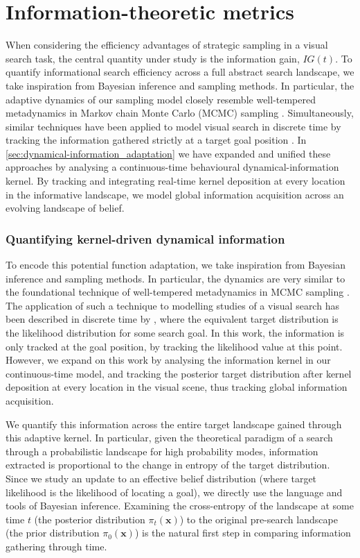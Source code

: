 \section{Information-theoretic metrics}\label{sec:information-theoretic_metrics}
When considering the efficiency advantages of strategic sampling in a visual search task, the central quantity under study is the information gain, $IG(t)$. To quantify informational search efficiency across a full abstract search landscape, we take inspiration from Bayesian inference and sampling methods. In particular, the adaptive dynamics of our sampling model closely resemble well-tempered metadynamics in Markov chain Monte Carlo (MCMC) sampling \cite{tiwary_time-independent_2015}. Simultaneously, similar techniques have been applied to model visual search in discrete time by tracking the information gathered strictly at a target goal position \cite{bujia_modeling_2022}. In \cref{sec:dynamical-information_adaptation} we have expanded and unified these approaches by analysing a continuous-time behavioural dynamical-information kernel. By tracking and integrating real-time kernel deposition at every location in the informative landscape, we model global information acquisition across an evolving landscape of belief. 

\subsubsection*{Quantifying kernel-driven dynamical information}
To encode this potential function adaptation, we take inspiration from Bayesian inference and sampling methods. In particular, the dynamics are very similar to the foundational technique of well-tempered metadynamics in MCMC sampling \cite{tiwary_time-independent_2015}. The application of such a technique to modelling studies of a visual search has been described in discrete time by \textcite{bujia_modeling_2022}, where the equivalent target distribution is the likelihood distribution for some search goal. In this work, the information is only tracked at the goal position, by tracking the likelihood value at this point. However, we expand on this work by analysing the information kernel in our continuous-time model, and tracking the posterior target distribution after kernel deposition at every location in the visual scene, thus tracking global information acquisition. 

We quantify this information across the entire target landscape gained through this adaptive kernel. In particular, given the theoretical paradigm of a search through a probabilistic landscape for high probability modes, information extracted is proportional to the change in entropy of the target distribution. Since we study an update to an effective belief distribution (where target likelihood is the likelihood of locating a goal), we directly use the language and tools of Bayesian inference. Examining the cross-entropy of the landscape at some time $t$ (the posterior distribution $\pi_t(\textbf{x})$) to the original pre-search landscape (the prior distribution $\pi_0(\textbf{x})$) is the natural first step in comparing information gathering through time.

